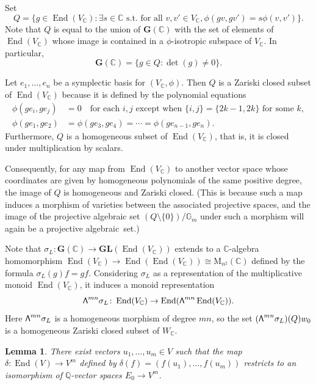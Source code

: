 \documentclass[11pt]{article}
\numberwithin{equation}{section}
\newcommand\bw{{\hbox{\large$\mathsf{\Lambda}$}}}
\newcommand{\bC}{\mathbb{C}}
\newcommand{\bG}{\mathbb{G}}
\newcommand{\bQ}{\mathbb{Q}}
\newcommand{\gG}{\mathbf{G}}
\newcommand{\gGL}{\mathbf{GL}}
\newcommand{\rM}{\mathrm{M}}
\DeclareMathOperator{\End}{End}
\let\extpower\bw
\newtheorem{lemma}{Lemma}[section]
\begin{document}
Set
\[
Q = \{ g \in \End(V_\bC) : \exists s \in \bC \text{ s.t.\ for all } v, v' \in V_\bC, \phi(gv, gv') = s \phi(v,v') \}.
\]
Note that $Q$ is equal to the union of $\gG(\bC)$ with the set of elements of $\End(V_\bC)$ whose image is contained in a $\phi$-isotropic subspace of $V_\bC$.
In particular,
\[
\gG(\bC) = \{ g \in Q : \det(g) \neq 0 \}.
\]

Let $e_1, \dotsc, e_n$ be a symplectic basis for $(V_\bC, \phi)$.
Then $Q$ is a Zariski closed subset of $\End(V_\bC)$ because it is defined by the polynomial equations
\begin{align*}
\phi(ge_i, ge_j) &= 0 \quad\text{for each } i, j \text{ except when } \{ i,j \} = \{ 2k-1,2k \} \text{ for some } k,
\\ \phi(ge_1, ge_2) &= \phi(ge_3, ge_4) = \dotsb = \phi(ge_{n-1}, ge_n).
\end{align*}
Furthermore, $Q$ is a homogeneous subset of $\End(V_\bC)$, that is, it is closed under multiplication by scalars.

Consequently, for any map from $\End(V_\bC)$ to another vector space whose coordinates are given by homogeneous polynomials of the same positive degree, the image of $Q$ is homogeneous and Zariski closed.
(This is because such a map induces a morphism of varieties between the associated projective spaces, and the image of the projective alge\-braic set $(Q \setminus \{0\})/\bG_m$ under such a morphism will again be a projective algebraic~set.)

Note that $\sigma_L : \gG(\bC) \to \gGL(\End(V_\bC))$ extends to a $\bC$-algebra homomorphism $\End(V_\bC) \to \End(\End(V_\bC)) \cong \rM_{n^2}(\bC)$ defined by the formula $\sigma_L(g)f = gf$. Considering $\sigma_L$ as a representation of the multiplicative monoid $\End(V_\bC)$, it induces a monoid representation
\[
\extpower^{mn} \sigma_L \colon\End(V_\bC) \to \End(\extpower^{mn} \End(V_\bC)).
\]
Here $\extpower^{mn} \sigma_L$ is a homogeneous morphism of degree $mn$, so the set $(\extpower^{mn} \sigma_L)(Q)w_0$ is a homogeneous Zariski closed subset of $W_\bC$.

\begin{lemma} \label{exist-u}
There exist vectors $u_1, \dotsc, u_m \!\in\! V$ such that the map \hbox{$\delta \colon \End(V) \to V^m$} defined by $\delta(f) = (f(u_1), \dotsc, f(u_m))$ restricts to an isomorphism of $\bQ$-vector spaces $E_0 \to V^m$.
\end{lemma}
\end{document}
